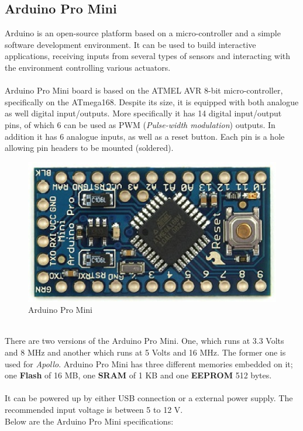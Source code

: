 \documentclass[12pt,a4paper,draft]{report}
\begin{document}
\subsection{Arduino Pro Mini}
Arduino is an open-source platform based on a micro-controller and a simple software development environment. It can be used to build interactive applications, receiving inputs from several types of sensors and interacting with the environment controlling various actuators.\\
\ \\
Arduino Pro Mini board is based on the ATMEL AVR 8-bit micro-controller, specifically on the ATmega168. Despite its size, it is equipped with both analogue as well digital input/outputs. More specifically it has 14 digital input/output pins, of which 6 can be used as PWM (\textit{Pulse-width modulation}) outputs. In addition it has 6 analogue inputs, as well as a reset button. Each pin is a hole allowing pin headers to be mounted (soldered).\ \\
\begin{figure}[H]
\centering
\includegraphics*[scale=0.4]{arduinopromini}
\caption{Arduino Pro Mini} 
\end{figure}
\ \\
There are two versions of the Arduino Pro Mini. One, which runs at 3.3 Volts and 8 MHz and another which runs at 5 Volts and 16 MHz. The former one is used for \emph{Apollo}. Arduino Pro Mini has three different memories embedded on it; one \textbf{Flash} of 16 MB, one \textbf{SRAM} of 1 KB and one \textbf{EEPROM} 512 bytes.\\
\ \\
It can be powered up by either USB connection or a external power supply. The recommended input voltage is between 5 to 12 V.
\ \\
%
Below are the Arduino Pro Mini specifications:
\end{document}
